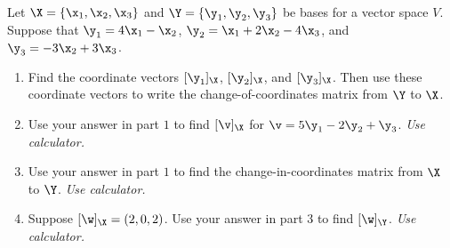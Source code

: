 \begin{question}
  \label{qst:}

  Let $\X = \{\x_1, \x_2, \x_3\}$ and $\Y = \{\y_1, \y_2, \y_3\}$ be bases for a
  vector space $V$. Suppose that $\y_1 = 4\x_1 - \x_2$, $\y_2 = \x_1 + 2\x_2 -
  4\x_3$, and $\y_3 = -3\x_2 + 3\x_3$.
  \begin{enumerate}
    \label{enum:_qst}

    \item Find the coordinate vectors $[\y_1]_\X$, $[\y_2]_\X$, and $[\y_3]_\X$.
      Then use these coordinate vectors to write the change-of-coordinates
      matrix from $\Y$ to $\X$.

    \item Use your answer in part $1$ to find $[\v]_\X$ for $\v = 5\y_1 - 2\y_2
      + \y_3$. \textit{Use calculator.}

    \item Use your answer in part $1$ to find the change-in-coordinates matrix
      from $\X$ to $\Y$. \textit{Use calculator.}

    \item Suppose $[\w]_\X = (2,0,2)$. Use your answer in part $3$ to find
      $[\w]_\Y$. \textit{Use calculator.}
  \end{enumerate}
\end{question}

